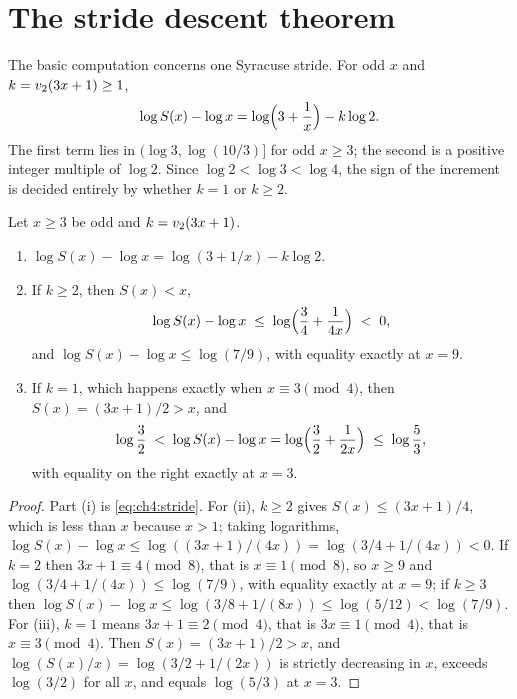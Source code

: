 \section{The stride descent theorem}\label{sec:ch4:stride}

The basic computation concerns one Syracuse stride.  For odd $x$ and
$k=v_2(3x+1)\ge1$,
\begin{equation}\label{eq:ch4:stride}
  \log S(x)-\log x=\log\Bigl(3+\frac1x\Bigr)-k\log2 .
\end{equation}
The first term lies in $(\log 3,\log(10/3)]$ for odd $x\ge3$; the second is a
positive integer multiple of $\log2$.  Since $\log2<\log3<\log4$, the sign
of the increment is decided entirely by whether $k=1$ or $k\ge2$.

\begin{theorem}\label{thm:stride}
Let $x\ge3$ be odd and $k=v_2(3x+1)$.
\begin{enumerate}[label=(\roman*)]
\item $\log S(x)-\log x=\log(3+1/x)-k\log 2$.
\item If $k\ge2$, then $S(x)<x$,
  \[
    \log S(x)-\log x\;\le\;\log\Bigl(\frac34+\frac1{4x}\Bigr)\;<\;0 ,
  \]
  and $\log S(x)-\log x\le\log(7/9)$, with equality exactly at $x=9$.
\item If $k=1$, which happens exactly when $x\equiv3\pmod4$, then
  $S(x)=(3x+1)/2>x$, and
  \[
    \log\frac32\;<\;\log S(x)-\log x=\log\Bigl(\frac32+\frac1{2x}\Bigr)\;\le\;\log\frac53,
  \]
  with equality on the right exactly at $x=3$.
\end{enumerate}
\end{theorem}

\begin{proof}
Part (i) is \eqref{eq:ch4:stride}.  For (ii), $k\ge2$ gives
$S(x)\le(3x+1)/4$, which is less than $x$ because $x>1$; taking logarithms,
$\log S(x)-\log x\le\log((3x+1)/(4x))=\log(3/4+1/(4x))<0$. If $k=2$ then $3x+1\equiv4\pmod8$, that is $x\equiv1\pmod8$, so $x\ge9$ and $\log(3/4+1/(4x))\le\log(7/9)$, with equality exactly at $x=9$; if $k\ge3$ then $\log S(x)-\log x\le\log(3/8+1/(8x))\le\log(5/12)<\log(7/9)$.  For (iii), $k=1$ means
$3x+1\equiv2\pmod4$, that is $3x\equiv1\pmod4$, that is $x\equiv3\pmod4$.
Then $S(x)=(3x+1)/2>x$, and $\log(S(x)/x)=\log(3/2+1/(2x))$ is strictly
decreasing in $x$, exceeds $\log(3/2)$ for all $x$, and equals
$\log(5/3)$ at $x=3$.
\end{proof}

